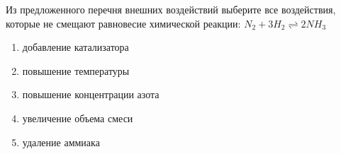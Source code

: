 Из предложенного перечня внешних воздействий выберите все воздействия, которые не смещают равновесие химической реакции:
$N_2 + 3H_2 \rightleftharpoons 2NH_3$

\begin{enumerate}
    \item добавление катализатора
    \item повышение температуры
    \item повышение концентрации азота
    \item увеличение объема смеси
    \item удаление аммиака
\end{enumerate}

